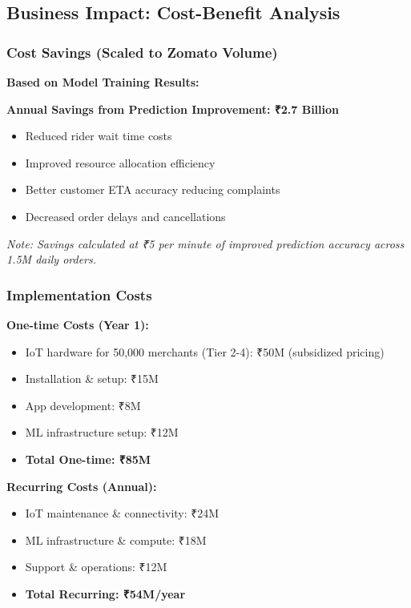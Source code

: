 \documentclass[11pt,a4paper]{article}
\begin{document}
\subsection{Business Impact: Cost-Benefit Analysis}

\subsubsection{Cost Savings (Scaled to Zomato Volume)}

\textbf{Based on Model Training Results:}

\textbf{Annual Savings from Prediction Improvement: ₹2.7 Billion}

\begin{itemize}
    \item Reduced rider wait time costs
    \item Improved resource allocation efficiency
    \item Better customer ETA accuracy reducing complaints
    \item Decreased order delays and cancellations
\end{itemize}

\textit{Note: Savings calculated at ₹5 per minute of improved prediction accuracy across 1.5M daily orders.}

\subsubsection{Implementation Costs}

\textbf{One-time Costs (Year 1):}
\begin{itemize}[leftmargin=*]
    \item IoT hardware for 50,000 merchants (Tier 2-4): ₹50M (subsidized pricing)
    \item Installation \& setup: ₹15M
    \item App development: ₹8M
    \item ML infrastructure setup: ₹12M
    \item \textbf{Total One-time: ₹85M}
\end{itemize}

\textbf{Recurring Costs (Annual):}
\begin{itemize}[leftmargin=*]
    \item IoT maintenance \& connectivity: ₹24M
    \item ML infrastructure \& compute: ₹18M
    \item Support \& operations: ₹12M
    \item \textbf{Total Recurring: ₹54M/year}
\end{itemize}
\end{document}
